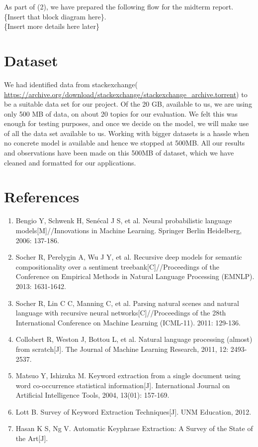 \documentclass[dvips,12pt]{article}
\begin{document}
		As part of (2), we have prepared the following flow for the midterm report.
		\\\{Insert that block diagram here\}. 
		\\\{Insert more details here later\}
		
	\section{Dataset}
		We had identified data from stackexchange( \url{https://archive.org/download/stackexchange/stackexchange_archive.torrent}) to be a suitable data set for our project. 
		Of the 20 GB, available to us, we are using only 500 MB of data, on about 20 topics for our evaluation. We felt this was enough for testing purposes, and once we decide on the model, we will make use of all the data set available to us. Working with bigger datasets is a hassle when no concrete model is available and hence we stopped at 500MB.
		All our results and observations have been made on this 500MB of dataset, which we have cleaned and formatted for our applications. 
	
	\section{References}
    \begin{enumerate}
        \item Bengio Y, Schwenk H, Senécal J S, et al. Neural probabilistic language models[M]//Innovations in Machine Learning. Springer Berlin Heidelberg, 2006: 137-186.
        \item Socher R, Perelygin A, Wu J Y, et al. Recursive deep models for semantic compositionality over a sentiment treebank[C]//Proceedings of the Conference on Empirical Methods in Natural Language Processing (EMNLP). 2013: 1631-1642.
        \item Socher R, Lin C C, Manning C, et al. Parsing natural scenes and natural language with recursive neural networks[C]//Proceedings of the 28th International Conference on Machine Learning (ICML-11). 2011: 129-136.
        \item Collobert R, Weston J, Bottou L, et al. Natural language processing (almost) from scratch[J]. The Journal of Machine Learning Research, 2011, 12: 2493-2537.
        \item Matsuo Y, Ishizuka M. Keyword extraction from a single document using word co-occurrence statistical information[J]. International Journal on Artificial Intelligence Tools, 2004, 13(01): 157-169.
        \item Lott B. Survey of Keyword Extraction Techniques[J]. UNM Education, 2012.
        \item Hasan K S, Ng V. Automatic Keyphrase Extraction: A Survey of the State of the Art[J].
    \end{enumerate}
\end{document}
